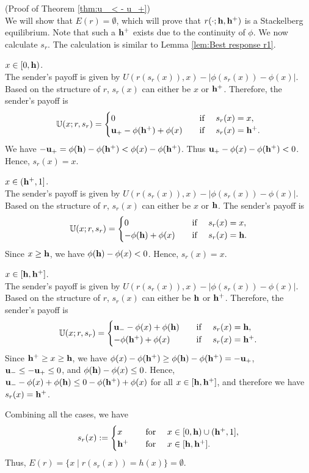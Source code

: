 \begin{apdxproof}(Proof of Theorem \ref{thm:u_ < - u_+})\label{proof:u_ < - u_+}\\

We will show that $E(r) = \emptyset$, which will prove that $r(\cdot;\mathbf{h},\mathbf{h^{+}})$ is a Stackelberg equilibrium. Note that such a $\mathbf{h^{+}}$ exists due to the continuity of $\phi$. We now calculate $s_r$. The calculation is similar to Lemma \ref{lem:Best response r1}.

	\begin{case}{$x \in [0, \mathbf{h})$.}\\
		The sender's payoff is given by $U(r(s_r(x)),x) - |\phi(s_r(x)) - \phi(x)|$. Based on the structure of $r$, $s_r(x)$ can either be $x$ or $\mathbf{h^{+}}$. Therefore, the sender's payoff is
		\[
		\mathbb{U}(x; r, s_r) = \begin{cases}
			0 & \hbox{\quad if \quad} s_r(x) = x,\\
		\mathbf{u_+} - \phi(\mathbf{h^{+}}) + \phi(x) & \hbox{\quad if \quad} s_r(x) = \mathbf{h^{+}}.
		\end{cases}
		\]
	We have $- \mathbf{u_+} = \phi(\mathbf{h}) - \phi(\mathbf{h^{+}}) < \phi(x) - \phi(\mathbf{h^{+}})$. Thus $\mathbf{u_+} - \phi(x) - \phi(\mathbf{h^{+}}) <0$. Hence, $s_r(x) = x$.
	\end{case}

	\begin{case}{$x \in (\mathbf{h^{+}}, 1]$.}\\
		The sender's payoff is given by $U(r(s_r(x)),x) - |\phi(s_r(x)) - \phi(x)|$. Based on the structure of $r$, $s_r(x)$ can either be $x$ or $\mathbf{h}$. The sender's payoff is
		\[
		\mathbb{U}(x; r, s_r) = \begin{cases}
			0 & \hbox{\quad if \quad} s_r(x) = x,\\
		- \phi(\mathbf{h}) + \phi(x) & \hbox{\quad if \quad} s_r(x) = \mathbf{h}.
		\end{cases}
		\]
		Since $x \geq \mathbf{h}$, we have $\phi(\mathbf{h}) - \phi(x) < 0$. Hence, $s_r(x) = x$.
	\end{case}

	\begin{case}{$x \in [\mathbf{h}, \mathbf{h^{+}}]$.}\\
		The sender's payoff is given by $U(r(s_r(x)),x) - |\phi(s_r(x)) - \phi(x)|$. Based on the structure of $r$, $s_r(x)$ can either be $\mathbf{h}$ or $\mathbf{h^{+}}$. Therefore, the sender's payoff is
		\[
		\mathbb{U}(x; r, s_r) = \begin{cases}
			\mathbf{u_-} - \phi(x) + \phi(\mathbf{h}) & \hbox{\quad if \quad} s_r(x) = \mathbf{h},\\
		 - \phi(\mathbf{h^{+}}) + \phi(x) & \hbox{\quad if \quad} s_r(x) = \mathbf{h^{+}}.
		\end{cases}
		\]
		Since $\mathbf{h^{+}} \geq x \geq \mathbf{h}$, we have $\phi(x) - \phi(\mathbf{h^{+}}) \geq \phi(\mathbf{h}) - \phi(\mathbf{h^{+}}) = -\mathbf{u_+}$, $\mathbf{u_-} \leq -\mathbf{u_+} \leq 0$, and $\phi(\mathbf{h}) - \phi(x) \leq 0$. Hence, $\mathbf{u_-} - \phi(x) + \phi(\mathbf{h}) \leq 0 - \phi(\mathbf{h^{+}}) + \phi(x)$ for all $x \in [\mathbf{h}, \mathbf{h^{+}}]$, and therefore we have $s_r(x) = \mathbf{h^{+}}$.
	\end{case}

	\noindent	Combining all the cases, we have
	\[
	s_r(x) := \begin{cases}
		x & \hbox{\quad for \quad} x \in [0, \mathbf{h}) \cup (\mathbf{h^{+}}, 1],\\
		\mathbf{h^{+}} & \hbox{\quad for \quad} x \in [\mathbf{h}, \mathbf{h^{+}}].
	\end{cases}
	\]
	\noindent Thus, $E(r) = \{x \mid r(s_r(x)) = h(x)\} = \emptyset$.
\end{apdxproof}


